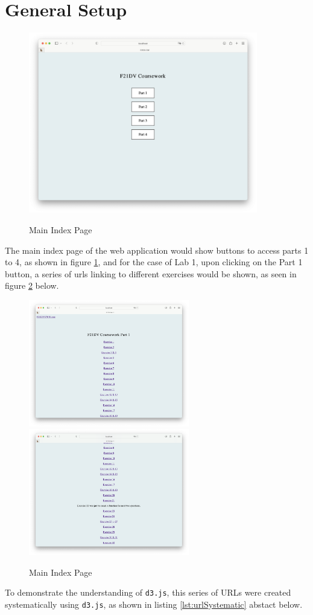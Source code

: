 \documentclass{scrreprt}
\begin{document}
\section{General Setup}
\begin{figure}[!ht]
    \centering
    \includegraphics[width = 10cm]{images/main.png}
    \label{fig:main}
    \caption{Main Index Page}
\end{figure}
\FloatBarrier
The main index page of the web application would show buttons to access parts 1 to
4, as shown in figure \ref{fig:main}, and for the case of Lab 1, upon clicking on
the Part 1 button, a series of urls linking to different exercises would be shown,
as seen in figure \ref{fig:part1} below.
\begin{figure}[!ht]
    \centering
    \includegraphics[width = 7cm]{images/part1_1.png}
    \includegraphics[width = 7cm]{images/part1_2.png}
    \label{fig:part1}
    \caption{Main Index Page}
\end{figure}
\FloatBarrier
To demonstrate the understanding of \verb|d3.js|, this series of URLs were created
systematically using \verb|d3.js|, as shown in listing \ref{lst:urlSystematic} abstact
below. 
\end{document}
